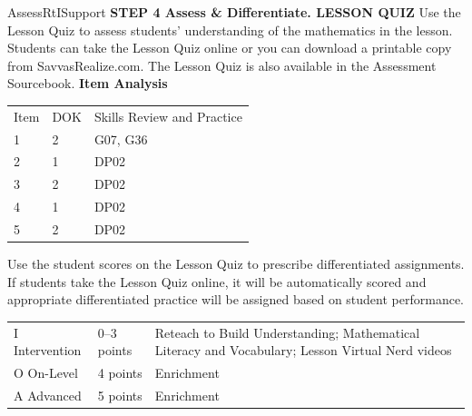 \documentclass{article}
\newenvironment{te-addendum}[2]{}{}     %
\begin{document}
\begin{te-addendum}{Assess}{RtISupport}
\textbf{STEP 4 Assess \& Differentiate. LESSON QUIZ}
Use the Lesson Quiz to assess students' understanding of the mathematics in the lesson.
Students can take the Lesson Quiz online or you can download a printable copy from SavvasRealize.com. The Lesson Quiz is also available in the Assessment Sourcebook.
\textbf{Item Analysis}
\begin{tabular}{lll}
Item & DOK & Skills Review and Practice \\
1 & 2 & G07, G36 \\
2 & 1 & DP02 \\
3 & 2 & DP02 \\
4 & 1 & DP02 \\
5 & 2 & DP02 \\
\end{tabular}
Use the student scores on the Lesson Quiz to prescribe differentiated assignments.
If students take the Lesson Quiz online, it will be automatically scored and appropriate differentiated practice will be assigned based on student performance.
\begin{tabular}{lll}
I Intervention & 0--3 points & Reteach to Build Understanding; Mathematical Literacy and Vocabulary; Lesson Virtual Nerd videos \\
O On-Level & 4 points & Enrichment \\
A Advanced & 5 points & Enrichment \\
\end{tabular}
\end{te-addendum}
\end{document}
